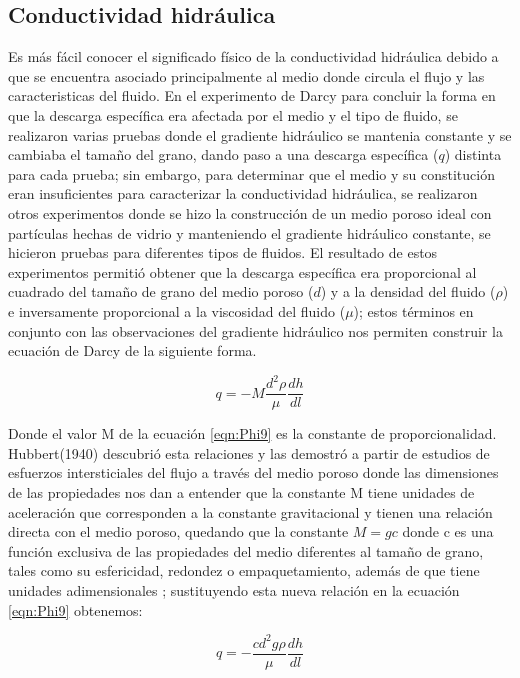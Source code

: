 \subsection{Conductividad hidráulica}

Es más fácil conocer el significado físico de la conductividad hidráulica debido a que se encuentra asociado principalmente al medio donde circula el flujo y las caracteristicas del fluido. En el experimento de Darcy para concluir la forma en que la descarga específica era afectada por el medio y el tipo de fluido, se realizaron varias pruebas donde el gradiente hidráulico se mantenia constante y se cambiaba el tamaño del grano, dando paso a una descarga específica ($q$) distinta para cada prueba; sin embargo, para determinar que el medio y su constitución eran insuficientes para caracterizar la conductividad hidráulica, se realizaron otros experimentos donde se hizo la construcción de un medio poroso ideal con partículas hechas de vidrio y manteniendo el gradiente hidráulico constante, se hicieron pruebas para diferentes tipos de fluidos. El resultado de estos experimentos permitió obtener que la descarga específica era proporcional al cuadrado del tamaño de grano del medio poroso ($d$) y a la densidad del fluido ($\rho$) e inversamente proporcional a la viscosidad del fluido ($\mu$); estos términos en conjunto con las observaciones del gradiente hidráulico nos permiten construir la ecuación de Darcy de la siguiente forma.

\begin{equation}
\label{eqn:Phi9}
q=-M\dfrac{d^{2}\rho}{\mu}\dfrac{dh}{dl}
\end{equation}   

Donde el valor M de la ecuación \ref{eqn:Phi9} es la constante de proporcionalidad. Hubbert(1940) descubrió esta relaciones y las demostró a partir de estudios de esfuerzos intersticiales del flujo a través del medio poroso donde las dimensiones de las propiedades nos dan a entender que la constante M tiene unidades de aceleración que corresponden a la constante gravitacional y tienen una relación directa con el medio poroso, quedando que la constante $M=gc$ donde c es una función exclusiva de las propiedades del medio diferentes al tamaño de grano, tales como su esfericidad, redondez o empaquetamiento, además de que tiene unidades adimensionales \cite{Hubbert1940}; sustituyendo esta nueva relación en la ecuación \ref{eqn:Phi9} obtenemos:

\begin{equation}
\label{eqn:Phi10}
q=-\dfrac{cd^{2}g\rho}{\mu}\dfrac{dh}{dl}
\end{equation}   

